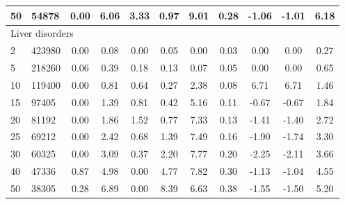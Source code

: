 {\begin{longtable}{@{}llccccccccc@{}}
\multicolumn{1}{l|}{50} & \multicolumn{1}{l|}{54878}      & 0.00 & \multicolumn{1}{c|}{6.06}  & 3.33  & \multicolumn{1}{c|}{0.97} & 9.01  & \multicolumn{1}{c|}{0.28} & -1.06     & -1.01     & 6.18  \\ \hline
\multicolumn{11}{l}{Liver disorders}                                                                                                                                                                  \\ \hline
\multicolumn{1}{l|}{2}  & \multicolumn{1}{l|}{423980}     & 0.00 & \multicolumn{1}{c|}{0.08}  & 0.00  & \multicolumn{1}{c|}{0.05} & 0.00  & \multicolumn{1}{c|}{0.03} & 0.00      & 0.00      & 0.27  \\
\multicolumn{1}{l|}{5}  & \multicolumn{1}{l|}{218260}     & 0.06 & \multicolumn{1}{c|}{0.39}  & 0.18  & \multicolumn{1}{c|}{0.13} & 0.07  & \multicolumn{1}{c|}{0.05} & 0.00      & 0.00      & 0.65  \\
\multicolumn{1}{l|}{10} & \multicolumn{1}{l|}{119400}     & 0.00 & \multicolumn{1}{c|}{0.81}  & 0.64  & \multicolumn{1}{c|}{0.27} & 2.38  & \multicolumn{1}{c|}{0.08} & 6.71      & 6.71      & 1.46  \\
\multicolumn{1}{l|}{15} & \multicolumn{1}{l|}{97405}      & 0.00 & \multicolumn{1}{c|}{1.39}  & 0.81  & \multicolumn{1}{c|}{0.42} & 5.16  & \multicolumn{1}{c|}{0.11} & -0.67     & -0.67     & 1.84  \\
\multicolumn{1}{l|}{20} & \multicolumn{1}{l|}{81192}      & 0.00 & \multicolumn{1}{c|}{1.86}  & 1.52  & \multicolumn{1}{c|}{0.77} & 7.33  & \multicolumn{1}{c|}{0.13} & -1.41     & -1.40     & 2.72  \\
\multicolumn{1}{l|}{25} & \multicolumn{1}{l|}{69212}      & 0.00 & \multicolumn{1}{c|}{2.42}  & 0.68  & \multicolumn{1}{c|}{1.39} & 7.49  & \multicolumn{1}{c|}{0.16} & -1.90     & -1.74     & 3.30  \\
\multicolumn{1}{l|}{30} & \multicolumn{1}{l|}{60325}      & 0.00 & \multicolumn{1}{c|}{3.09}  & 0.37  & \multicolumn{1}{c|}{2.20} & 7.77  & \multicolumn{1}{c|}{0.20} & -2.25     & -2.11     & 3.66  \\
\multicolumn{1}{l|}{40} & \multicolumn{1}{l|}{47336}      & 0.87 & \multicolumn{1}{c|}{4.98}  & 0.00  & \multicolumn{1}{c|}{4.77} & 7.82  & \multicolumn{1}{c|}{0.30} & -1.13     & -1.04     & 4.55  \\
\multicolumn{1}{l|}{50} & \multicolumn{1}{l|}{38305}      & 0.28 & \multicolumn{1}{c|}{6.89}  & 0.00  & \multicolumn{1}{c|}{8.39} & 6.63  & \multicolumn{1}{c|}{0.38} & -1.55     & -1.50     & 5.20  \\ \hline

\end{longtable}}
